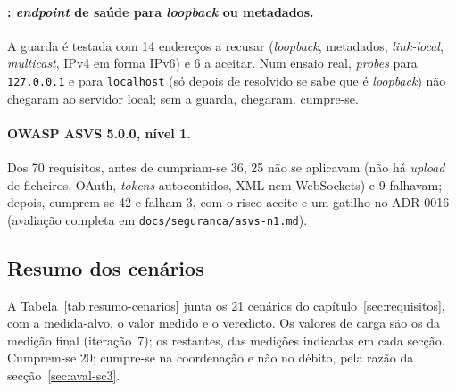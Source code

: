 \paragraph{: \emph{endpoint} de saúde para \emph{loopback} ou metadados.}
A guarda é testada com 14 endereços a recusar (\emph{loopback}, metadados, \emph{link-local}, \emph{multicast},
IPv4 em forma IPv6) e 6 a aceitar. Num ensaio real, \emph{probes} para \texttt{127.0.0.1} e para \texttt{localhost}
(só depois de resolvido se sabe que é \emph{loopback}) não chegaram ao servidor local; sem a guarda, chegaram.
 cumpre-se.

\paragraph{OWASP ASVS 5.0.0, nível 1.}
Dos 70 requisitos, antes de  cumpriam-se 36, 25 não se aplicavam (não há \emph{upload} de ficheiros,
OAuth, \emph{tokens} autocontidos, XML nem WebSockets) e 9 falhavam; depois, cumprem-se 42 e falham 3, com o risco
aceite e um gatilho no ADR-0016 (avaliação completa em \texttt{docs/seguranca/asvs-n1.md}).

\subsection{Resumo dos cenários}
\label{sec:resumo-cenarios}

A Tabela~\ref{tab:resumo-cenarios} junta os 21 cenários do capítulo~\ref{sec:requisitos}, com a medida-alvo, o
valor medido e o veredicto. Os valores de carga são os da medição final (iteração~7); os restantes, das
medições indicadas em cada secção. Cumprem-se 20;  cumpre-se na coordenação e não no débito, pela razão
da secção~\ref{sec:aval-sc3}.

